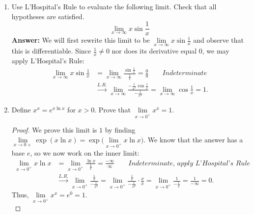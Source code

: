 \documentclass{article}
\begin{document}
\begin{enumerate}
        \item Use L'Hospital's Rule to evaluate the following limit. Check that all hypotheses are satisfied.
            \[\lim _{x \to \infty} x\sin{\frac{1}{x}}\]
        \textbf{Answer: }We will first rewrite this limit to be $\lim\limits_{x \to \infty} x\sin{\frac{1}{x}}$ and observe that this is differentiable. Since $\frac{1}{x} \neq 0$ nor does its derivative equal $0$, we may apply L'Hospital's Rule:\\
            \begin{align*}
                \lim_{x \to \infty} x \sin{\frac{1}{x}} &= \lim_{x \to \infty} \frac{\sin{\frac{1}{x}}}{\frac{1}{x}} = \frac{0}{0} \qquad \textit{Indeterminate}\\
                &\xrightarrow{L.R.} \lim_{x \to \infty} \frac{-\frac{1}{x^2}\cos{\frac{1}{x}}}{-\frac{1}{x^2}} = \lim_{x \to \infty} \cos{\frac{1}{x}} = 1.
            \end{align*}
        
        \item Define $x^x = e^{x\ln{x}}$ for $x > 0$. Prove that $\lim\limits_{x \to 0^+} x^x = 1$.
        \begin{proof}
            We prove this limit is $1$ by finding $\lim\limits_{x \to 0+} \exp({x\ln{x}}) = \exp\big({\lim\limits_{x \to 0^+} x\ln{x}}\big)$. We know that the answer has a base $e$, so we now work on the inner limit:
            \begin{align*}
                \lim_{x \to 0^+} x\ln{x} &= \lim_{x \to 0^+} \frac{\ln{x}}{\frac{1}{x}} = \frac{-\infty}{\infty} \qquad \textit{Indeterminate, apply L'Hospital's Rule}\\
                &\xrightarrow{L.R.} \lim_{x \to 0^+} \frac{\frac{1}{x}}{-\frac{1}{x^2}} = \lim_{x \to 0^+} \frac{\frac{1}{x}}{-\frac{1}{x^2}} \cdot \frac{x}{x} = \lim_{x \to 0^+} \frac{1}{-\frac{1}{x}} = \frac{1}{-\infty} = 0.
            \end{align*}
        Thus, $\lim\limits_{x \to 0^+} x^x = e^0 = 1$.\\
        \end{proof}
    \end{enumerate}
\end{document}
